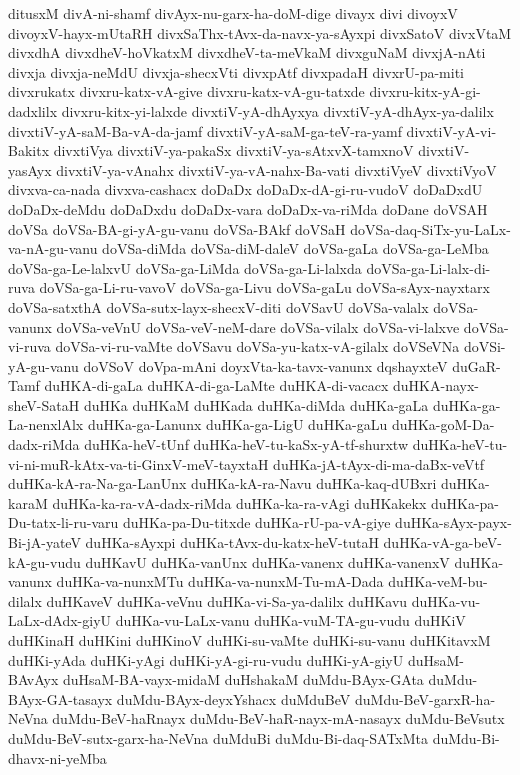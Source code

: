 {ditusxM
divA-ni-shamf
divAyx-nu-garx-ha-doM-dige
divayx
divi
divoyxV
divoyxV-hayx-mUtaRH
divxSaThx-tAvx-da-navx-ya-sAyxpi
divxSatoV
divxVtaM
divxdhA
divxdheV-hoVkatxM
divxdheV-ta-meVkaM
divxguNaM
divxjA-nAti
divxja
divxja-neMdU
divxja-shecxVti
divxpAtf
divxpadaH
divxrU-pa-miti
divxrukatx
divxru-katx-vA-give
divxru-katx-vA-gu-tatxde
divxru-kitx-yA-gi-dadxlilx
divxru-kitx-yi-lalxde
divxtiV-yA-dhAyxya
divxtiV-yA-dhAyx-ya-dalilx
divxtiV-yA-saM-Ba-vA-da-jamf
divxtiV-yA-saM-ga-teV-ra-yamf
divxtiV-yA-vi-Bakitx
divxtiVya
divxtiV-ya-pakaSx
divxtiV-ya-sAtxvX-tamxnoV
divxtiV-yasAyx
divxtiV-ya-vAnahx
divxtiV-ya-vA-nahx-Ba-vati
divxtiVyeV
divxtiVyoV
divxva-ca-nada
divxva-cashacx
doDaDx
doDaDx-dA-gi-ru-vudoV
doDaDxdU
doDaDx-deMdu
doDaDxdu
doDaDx-vara
doDaDx-va-riMda
doDane
doVSAH
doVSa
doVSa-BA-gi-yA-gu-vanu
doVSa-BAkf
doVSaH
doVSa-daq-SiTx-yu-LaLx-va-nA-gu-vanu
doVSa-diMda
doVSa-diM-daleV
doVSa-gaLa
doVSa-ga-LeMba
doVSa-ga-Le-lalxvU
doVSa-ga-LiMda
doVSa-ga-Li-lalxda
doVSa-ga-Li-lalx-di-ruva
doVSa-ga-Li-ru-vavoV
doVSa-ga-Livu
doVSa-gaLu
doVSa-sAyx-nayxtarx
doVSa-satxthA
doVSa-sutx-layx-shecxV-diti
doVSavU
doVSa-valalx
doVSa-vanunx
doVSa-veVnU
doVSa-veV-neM-dare
doVSa-vilalx
doVSa-vi-lalxve
doVSa-vi-ruva
doVSa-vi-ru-vaMte
doVSavu
doVSa-yu-katx-vA-gilalx
doVSeVNa
doVSi-yA-gu-vanu
doVSoV
doVpa-mAni
doyxVta-ka-tavx-vanunx
dqshayxteV
duGaR-Tamf
duHKA-di-gaLa
duHKA-di-ga-LaMte
duHKA-di-vacacx
duHKA-nayx-sheV-SataH
duHKa
duHKaM
duHKada
duHKa-diMda
duHKa-gaLa
duHKa-ga-La-nenxlAlx
duHKa-ga-Lanunx
duHKa-ga-LigU
duHKa-gaLu
duHKa-goM-Da-dadx-riMda
duHKa-heV-tUnf
duHKa-heV-tu-kaSx-yA-tf-shurxtw
duHKa-heV-tu-vi-ni-muR-kAtx-va-ti-GinxV-meV-tayxtaH
duHKa-jA-tAyx-di-ma-daBx-veVtf
duHKa-kA-ra-Na-ga-LanUnx
duHKa-kA-ra-Navu
duHKa-kaq-dUBxri
duHKa-karaM
duHKa-ka-ra-vA-dadx-riMda
duHKa-ka-ra-vAgi
duHKakekx
duHKa-pa-Du-tatx-li-ru-varu
duHKa-pa-Du-titxde
duHKa-rU-pa-vA-giye
duHKa-sAyx-payx-Bi-jA-yateV
duHKa-sAyxpi
duHKa-tAvx-du-katx-heV-tutaH
duHKa-vA-ga-beV-kA-gu-vudu
duHKavU
duHKa-vanUnx
duHKa-vanenx
duHKa-vanenxV
duHKa-vanunx
duHKa-va-nunxMTu
duHKa-va-nunxM-Tu-mA-Dada
duHKa-veM-bu-dilalx
duHKaveV
duHKa-veVnu
duHKa-vi-Sa-ya-dalilx
duHKavu
duHKa-vu-LaLx-dAdx-giyU
duHKa-vu-LaLx-vanu
duHKa-vuM-TA-gu-vudu
duHKiV
duHKinaH
duHKini
duHKinoV
duHKi-su-vaMte
duHKi-su-vanu
duHKitavxM
duHKi-yAda
duHKi-yAgi
duHKi-yA-gi-ru-vudu
duHKi-yA-giyU
duHsaM-BAvAyx
duHsaM-BA-vayx-midaM
duHshakaM
duMdu-BAyx-GAta
duMdu-BAyx-GA-tasayx
duMdu-BAyx-deyxYshacx
duMduBeV
duMdu-BeV-garxR-ha-NeVna
duMdu-BeV-haRnayx
duMdu-BeV-haR-nayx-mA-nasayx
duMdu-BeVsutx
duMdu-BeV-sutx-garx-ha-NeVna
duMduBi
duMdu-Bi-daq-SATxMta
duMdu-Bi-dhavx-ni-yeMba
}
